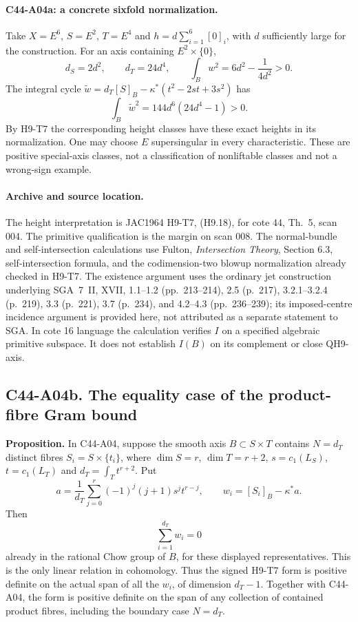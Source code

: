 \documentclass[11pt]{article}
\theoremstyle{remark}\newtheorem{remark}[theorem]{Remark}
\begin{document}
\paragraph{C44-A04a: a concrete sixfold normalization.}
Take $X=E^6$, $S=E^2$, $T=E^4$ and
$h=d\sum_{i=1}^{6}[0]_i$, with $d$ sufficiently large for the
construction. For an axis containing $E^2\times\{0\}$,
\[
 d_S=2d^2,\qquad d_T=24d^4,\qquad
 \int_Bw^2=6d^2-\frac1{4d^2}>0.
\]
The integral cycle $\widetilde w=d_T[S]_B-
\kappa^*(t^2-2st+3s^2)$ has
\[
        \int_B\widetilde w^2=144d^6(24d^4-1)>0.
\]
By H9-T7 the corresponding height classes have these exact heights
in its normalization. One may choose $E$ supersingular in every
characteristic. These are positive special-axis classes, not a
classification of nonliftable classes and not a wrong-sign example.

\paragraph{Archive and source location.}
The height interpretation is JAC1964 H9-T7, (H9.18), for cote 44,
Th.~5, scan 004. The primitive qualification is the margin on scan
008. The normal-bundle and self-intersection calculations use Fulton,
\emph{Intersection Theory}, Section 6.3, self-intersection formula,
and the codimension-two blowup normalization already checked in
H9-T7. The existence argument uses the ordinary jet construction
underlying SGA~7~II, XVII, 1.1--1.2 (pp.~213--214), 2.5
(p.~217), 3.2.1--3.2.4 (p.~219), 3.3 (p.~221), 3.7
(p.~234), and 4.2--4.3 (pp.~236--239); its imposed-centre
incidence argument is provided here, not attributed as a separate
statement to SGA. In cote 16 language the calculation verifies $I$
on a specified algebraic primitive subspace. It does not establish
$I(B)$ on its complement or close QH9-axis.


\subsection*{C44-A04b. The equality case of the product-fibre Gram bound}

\textbf{Proposition.}
In C44-A04, suppose the smooth axis $B\subset S\times T$ contains
$N=d_T$ distinct fibres $S_i=S\times\{t_i\}$, where
$\dim S=r$, $\dim T=r+2$, $s=c_1(L_S)$,
$t=c_1(L_T)$ and $d_T=\int_Tt^{r+2}$. Put
\[
 a=\frac1{d_T}\sum_{j=0}^r(-1)^j(j+1)s^jt^{r-j},
 \qquad w_i=[S_i]_B-\kappa^*a.
\]
Then
\[
 \sum_{i=1}^{d_T}w_i=0
 \tag{C44.A04b.1}
\]
already in the rational Chow group of $B$, for these displayed
representatives. This is the only linear relation in cohomology.
Thus the signed H9-T7 form is positive definite on the actual
span of all the $w_i$, of dimension $d_T-1$. Together with
C44-A04, the form is positive definite on the span of any
collection of contained product fibres, including the boundary
case $N=d_T$.
\end{document}
